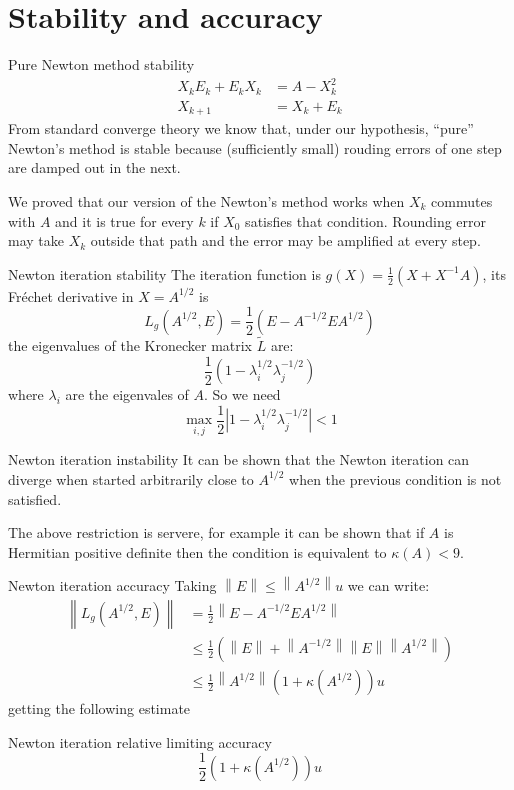 \documentclass{beamer}
\theoremstyle{plain}
\theoremstyle{definition}
\theoremstyle{remark}
\newcommand{\pa}[1]{\left(#1\right)}
\newcommand{\abs}[1]{\left|#1\right|}
\newcommand{\norm}[1]{\left\|#1\right\|}
\begin{document}
\section{Stability and accuracy}

\begin{frame}{Pure Newton method stability}
  \begin{align*}
    X_k E_k + E_k X_k &= A - X_k ^2 \\
    X_{k+1} &= X_k + E_k
  \end{align*}
  From standard converge theory we know that, under our hypothesis,
  ``pure'' Newton's method is stable because (sufficiently small)
  rouding errors of one step are damped out in the next. \vfill

  We proved that our version of the Newton's method works when $X_k$
  commutes with $A$ and it is true for every $k$ if $X_0$ satisfies
  that condition. Rounding error may take $X_k$ outside that path and
  the error may be amplified at every step.
\end{frame}

\begin{frame}{Newton iteration stability}
  The iteration function is $g(X) = \frac{1}{2}\pa{X+ X^{-1}A}$, its
  Fr\'echet derivative in $X=A^{1/2}$ is
  \[ L_g\pa{A^{1/2},E} = \frac{1}{2}\pa{E-A^{-1/2}EA^{1/2}} \]
  the eigenvalues of the Kronecker matrix $\tilde L$ are:
  \[ \frac{1}{2}\pa{1-\lambda _i ^{1/2} \lambda _j^{-1/2}} \]
  where $\lambda _i$ are the eigenvales of $A$. So we need
  \[ \max _{i,j} \frac{1}{2} \abs{ 1- \lambda _i^{1/2} \lambda
      _j^{-1/2}} <1 \]
\end{frame}

\begin{frame}{Newton iteration instability}
  It can be shown that the Newton iteration can diverge when started
  arbitrarily close to $A^{1/2}$ when the previous condition is not
  satisfied. \vfill

  The above restriction is servere, for example it can be shown that
  if $A$ is Hermitian positive definite then the condition is
  equivalent to $\kappa (A) <9$.
\end{frame}

\begin{frame}{Newton iteration accuracy}
  Taking $\norm{E} \le \norm{A^{1/2}} u$ we can write:
  \begin{align*}
    \norm{L_g\pa{A^{1/2},E}} &= \frac{1}{2}\norm{E-A^{-1/2}EA^{1/2}} \\
      &\le \frac{1}{2}\pa{\norm{E} +
        \norm{A^{-1/2}}\norm{E}\norm{A^{1/2}}} \\
    & \le \frac{1}{2}\norm{A^{1/2}}\pa{1+\kappa\pa{A^{1/2}}}u
  \end{align*}
  getting the following estimate
  \begin{block}{Newton iteration relative limiting accuracy}
    \[ \frac{1}{2}\pa{1+\kappa\pa{A^{1/2}}}u \]
  \end{block}
\end{frame}
\end{document}
